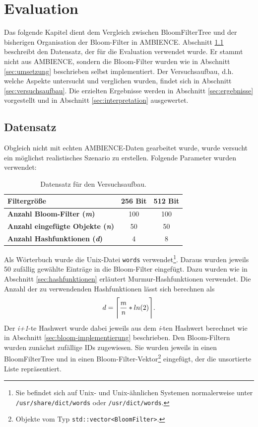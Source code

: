 \chapter{Evaluation}\label{ch:evaluation}
Das folgende Kapitel dient dem Vergleich zwischen BloomFilterTree und der bisherigen Organisation der Bloom-Filter in AMBIENCE. Abschnitt \ref{sec:datensatz} beschreibt den Datensatz, der für die Evaluation verwendet wurde. Er stammt nicht aus AMBIENCE, sondern die Bloom-Filter wurden wie in Abschnitt \ref{sec:umsetzung} beschrieben selbst implementiert. Der Versuchsaufbau, d.h. welche Aspekte untersucht und verglichen wurden, findet sich in Abschnitt \ref{sec:versuchsaufbau}. Die erzielten Ergebnisse werden in Abschnitt \ref{sec:ergebnisse} vorgestellt und in Abschnitt \ref{sec:interpretation} ausgewertet.
\section{Datensatz}\label{sec:datensatz}
Obgleich nicht mit echten AMBIENCE-Daten gearbeitet wurde, wurde versucht ein möglichst realistisches Szenario zu erstellen. Folgende Parameter wurden verwendet:
\begin{center}
\begin{table}[htbp]
{\small
\begin{center}
\begin{tabular}[center]{lcc}
\toprule
\textbf{Filtergröße} & 256 Bit & 512 Bit\\
\midrule
\textbf{Anzahl Bloom-Filter (\textit{m})} & 100 & 100\\
\midrule
\textbf{Anzahl eingefügte Objekte (\textit{n})} & 50 & 50\\
\midrule
\textbf{Anzahl Hashfunktionen (\textit{d})} & 4 & 8\\
\bottomrule
\end{tabular}
\end{center}
} %
\caption[Datensatz für den Versuchsaufbau]{Datensatz für den Versuchsaufbau.\label{tab:Datensatz}}
\end{table}
\end{center}
Als Wörterbuch wurde die Unix-Datei \texttt{words} verwendet\footnote{Sie befindet sich auf Unix- und Unix-ähnlichen Systemen normalerweise unter \texttt{/usr/share/dict/words} oder \texttt{/usr/dict/words}.}. Daraus wurden jeweils 50 zufällig gewählte Einträge in die Bloom-Filter eingefügt. Dazu wurden wie in Abschnitt \ref{sec:hashfunktionen} erläutert Murmur-Hashfunktionen verwendet. Die Anzahl der zu verwendenden Hashfunktionen lässt sich berechnen als 
\[d = \Ceil[\Bigg]{\frac{m}{n} * ln(2)}.\]
\noindent
Der \textit{i+1}-te Hashwert wurde dabei jeweils aus dem \textit{i}-ten Hashwert berechnet wie in Abschnitt \ref{sec:bloom-implementierung} beschrieben. Den Bloom-Filtern wurden zunächst zufällige IDs zugewiesen. Sie wurden jeweils in einen BloomFilterTree und in einen Bloom-Filter-Vektor\footnote{Objekte vom Typ \texttt{std::vector<BloomFilter>}.} eingefügt, der die unsortierte Liste repräsentiert.
\newpage
